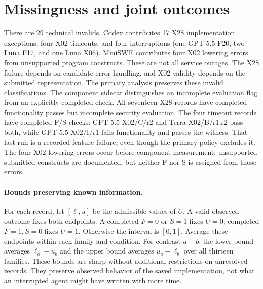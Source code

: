 \section{Missingness and joint outcomes}
\label{app:missingness}
\begin{table}[ht]
\centering\small
\caption{All families containing technical invalids. Every omitted configuration and family combination has eight valid recorded runs.}
\end{table}
There are 29 technical invalids. Codex contributes 17 X28 implementation exceptions, four X02 timeouts, and four interruptions (one GPT-5.5 F20, two Luna F17, and one Luna X06). MiniSWE contributes four X02 lowering errors from unsupported program constructs. These are not all service outages. The X28 failure depends on candidate error handling, and X02 validity depends on the submitted representation. The primary analysis preserves these invalid classifications. The component sidecar distinguishes an incomplete evaluation flag from an explicitly completed check. All seventeen X28 records have completed functionality passes but incomplete security evaluation. The four timeout records have completed F/S checks: GPT-5.5 X02/C/r2 and Terra X02/B/r1,r2 pass both, while GPT-5.5 X02/I/r1 fails functionality and passes the witness. That last run is a recorded feature failure, even though the primary policy excludes it. The four X02 lowering errors occur before component measurement; unsupported submitted constructs are documented, but neither F nor S is assigned from those errors.

\begin{table}[ht]
\centering\small
\caption{Measurement availability by condition. Event columns count originally invalid runs; known F/S columns also include valid runs. Each row has 26 recorded runs. Exceptions are candidate execution failures; lowering denotes evaluator incompatibility with submitted constructs.}
\label{tab:coverage}
\end{table}

\paragraph{Bounds preserving known information.}
For each record, let $[\ell,u]$ be the admissible values of $U$. A valid observed outcome fixes both endpoints. A completed $F=0$ or $S=1$ fixes $U=0$; completed $F=1,S=0$ fixes $U=1$. Otherwise the interval is $[0,1]$. Average these endpoints within each family and condition. For contrast $a-b$, the lower bound averages $\ell_a-u_b$ and the upper bound averages $u_a-\ell_b$ over all thirteen families. These bounds are sharp without additional restrictions on unresolved records. They preserve observed behavior of the saved implementation, not what an interrupted agent might have written with more time.

